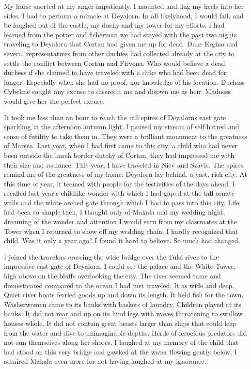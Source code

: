 \documentclass{article}
\begin{document}
My horse snorted at my anger impatiently. I mounted and dug my heels into her sides. I had to perform a miracle at Deyalorn. In all likelyhood, I would fail, and be laughed out of the castle, my duchy and my tower for my efforts. I had learned from the potter and fisherman we had stayed with the past two nights traveling to Deyalorn that Cortan had given me up for dead. Duke Ergino and several representatives from other duchies had collected already at the city to settle the conflict between Cortan and Firvona. Who would believe a dead duchess if she claimed to have traveled with a duke who had been dead for longer. Especially when she had no proof, nor knowledge of his location. Duchess Cybeline sought any excuse to discredit me and disown me as heir. Madness would give her the perfect excuse.

\vspace{.5cm}

It took me less than an hour to reach the tall spires of Deyalorns east gate sparkling in the afternoon autumn light. I paused my stream of self hatred and sense of futility to take them in. They were a brilliant monument to the greatness of Marsea. Last year, when I had first came to this city, a child who had never been outside the harsh border dutchy of Cortan, they had impressed me with their size and radiance. This year, I have traveled in Niev and Szavis. The spires remind me of the greatness of my home. Deyalorn lay behind, a vast, rich city. At this time of year, it teemed with people for the festivities of the days ahead. I recalled last year's childlike wonder with which I had gaped at the tall ornate walls and the white arched gate through which I had to pass into this city. Life had been so simple then, I thought only of Makala and my wedding night, dreaming of the wonder and attention I would earn from my classmates at the Tower when I returned to show off my wedding chain. I hardly recognized that child. Was it only a year ago? I found it hard to believe. So much had changed.

I joined the travelors crossing the wide bridge over the Tulsi river to the impressive east gate of Deyalorn. I could see the palace and the White Tower, high above on the bluffs overlooking the city. The river seemed tame and domesticated compared to the ocean I had just traveled. It as wide and deep. Quiet river boats ferried goods up and down its length. It held fish for the town. Washerwomen came to its banks with baskets of laundry. Children played at its banks. It did not rear and up on its hind legs with waves threatening to swallow houses whole. It did not contain great beasts larger than ships that could leap from the water and dive to unimaginable depths. Herds of ferocious predators did not sun themselves along her shores. I laughed at my memory of the child that had stood on this very bridge and gawked at the water flowing gently below. I admired Makala even more for not having laughed at my ignorance. 
\end{document}
